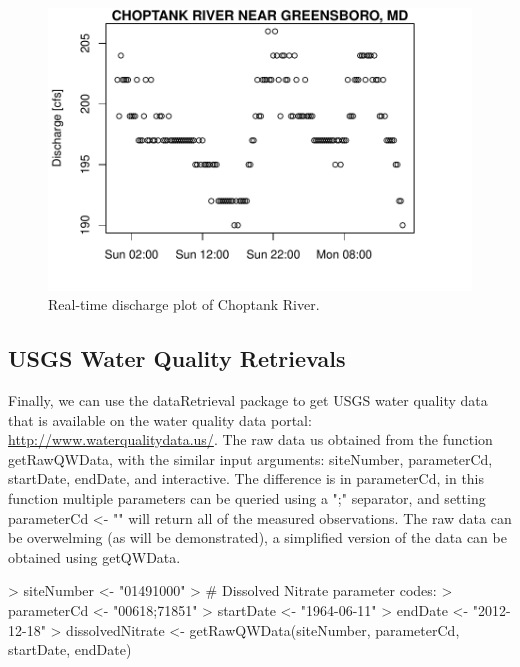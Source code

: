 \documentclass[a4paper,11pt]{article}
\begin{document}
\begin{figure}
\begin{center}
\includegraphics{dataRetrieval-fig2}
\end{center}
\caption{Real-time discharge plot of Choptank River.}
\end{figure}


\subsection{USGS Water Quality Retrievals}
\label{sec:usgsWQP}
Finally, we can use the dataRetrieval package to get USGS water quality data that is available on the water quality data portal: \url{http://www.waterqualitydata.us/}. The raw data us obtained from the function  getRawQWData, with the similar input arguments: siteNumber, parameterCd, startDate, endDate, and interactive. The difference is in parameterCd, in this function multiple parameters can be queried using a ";" separator, and setting parameterCd <- "" will return all of the measured observations. The raw data can be overwelming (as will be demonstrated), a simplified version of the data can be obtained using getQWData.


\begin{Schunk}
\begin{Sinput}
> siteNumber <- "01491000" 
> # Dissolved Nitrate parameter codes:
> parameterCd <- "00618;71851"  
> startDate <- "1964-06-11"
> endDate <- "2012-12-18"
> dissolvedNitrate <- getRawQWData(siteNumber, parameterCd, 
       startDate, endDate)
\end{Sinput}
\end{Schunk}
\end{document}
